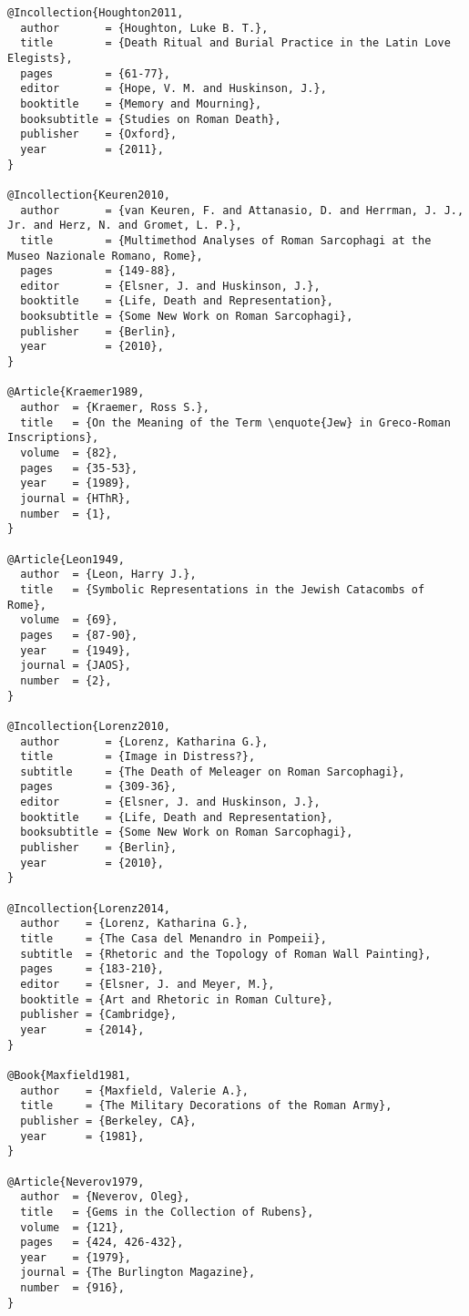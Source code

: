 \documentclass[a4paper,
10pt,
english
]{ltxdoc}
\begin{document}
\begin{lstlisting}
@Incollection{Houghton2011,
  author       = {Houghton, Luke B. T.},
  title        = {Death Ritual and Burial Practice in the Latin Love Elegists},
  pages        = {61-77},
  editor       = {Hope, V. M. and Huskinson, J.},
  booktitle    = {Memory and Mourning},
  booksubtitle = {Studies on Roman Death},
  publisher    = {Oxford},
  year         = {2011},
}

@Incollection{Keuren2010,
  author       = {van Keuren, F. and Attanasio, D. and Herrman, J. J., Jr. and Herz, N. and Gromet, L. P.},
  title        = {Multimethod Analyses of Roman Sarcophagi at the Museo Nazionale Romano, Rome},
  pages        = {149-88},
  editor       = {Elsner, J. and Huskinson, J.},
  booktitle    = {Life, Death and Representation},
  booksubtitle = {Some New Work on Roman Sarcophagi},
  publisher    = {Berlin},
  year         = {2010},
}

@Article{Kraemer1989,
  author  = {Kraemer, Ross S.},
  title   = {On the Meaning of the Term \enquote{Jew} in Greco-Roman Inscriptions},
  volume  = {82},
  pages   = {35-53},
  year    = {1989},
  journal = {HThR},
  number  = {1},
}

@Article{Leon1949,
  author  = {Leon, Harry J.},
  title   = {Symbolic Representations in the Jewish Catacombs of Rome},
  volume  = {69},
  pages   = {87-90},
  year    = {1949},
  journal = {JAOS},
  number  = {2},
}

@Incollection{Lorenz2010,
  author       = {Lorenz, Katharina G.},
  title        = {Image in Distress?},
  subtitle     = {The Death of Meleager on Roman Sarcophagi},
  pages        = {309-36},
  editor       = {Elsner, J. and Huskinson, J.},
  booktitle    = {Life, Death and Representation},
  booksubtitle = {Some New Work on Roman Sarcophagi},
  publisher    = {Berlin},
  year         = {2010},
}

@Incollection{Lorenz2014,
  author    = {Lorenz, Katharina G.},
  title     = {The Casa del Menandro in Pompeii},
  subtitle  = {Rhetoric and the Topology of Roman Wall Painting},
  pages     = {183-210},
  editor    = {Elsner, J. and Meyer, M.},
  booktitle = {Art and Rhetoric in Roman Culture},
  publisher = {Cambridge},
  year      = {2014},
}

@Book{Maxfield1981,
  author    = {Maxfield, Valerie A.},
  title     = {The Military Decorations of the Roman Army},
  publisher = {Berkeley, CA},
  year      = {1981},
}

@Article{Neverov1979,
  author  = {Neverov, Oleg},
  title   = {Gems in the Collection of Rubens},
  volume  = {121},
  pages   = {424, 426-432},
  year    = {1979},
  journal = {The Burlington Magazine},
  number  = {916},
}


\end{lstlisting}
\end{document}
